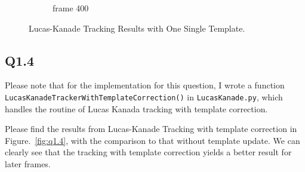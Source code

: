 \documentclass[11pt]{article}
\newcommand{\code}[1]{\texttt{#1}}
\begin{document}
\begin{figure}[h!]
\begin{subfigure}{.195\textwidth}
      \caption{frame 400}
    \end{subfigure}\hfill
    \caption{Lucas-Kanade Tracking Results with One Single Template. }
    \label{fig:q1.3}
\end{figure}

\newpage
\subsection*{Q1.4}

Please note that for the implementation for this question, I wrote a function \code{LucasKanadeTrackerWithTemplateCorrection()} in \code{LucasKanade.py}, which handles the routine of Lucas Kanada tracking with template correction.

Please find the results from Lucas-Kanade Tracking with template correction in Figure.~\ref{fig:q1.4}, with the comparison to that without template update. We can clearly see that the tracking with template correction yields a better result for later frames.
\end{document}
